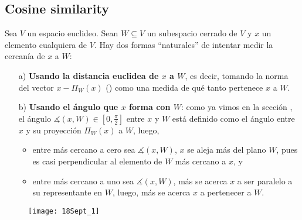 \QEDB
\vspace{0.2cm}





\subsection{Cosine similarity}
\label{cosine similarity}

Sea $V$ un espacio euclideo. 
Sean $W \subseteq V$ un subespacio cerrado de $V$ y 
$x$ un elemento cualquiera de $V$. Hay dos formas ``naturales''
de intentar medir la cercanía de $x$ a $W$:
\begin{itemize}
\item[a)] \textbf{Usando la distancia euclidea
de $x$ a $W$}, es decir, tomando la norma del vector
$x - \Pi_{W}(x)$ () como una medida
de qué tanto pertenece $x$ a $W$.
\item[b)] \textbf{Usando el ángulo que $x$ forma con $W$}: como ya
vimos en la sección , el ángulo 
$\measuredangle (x, W) \in [0, \frac{\pi}{2}]$
entre $x$ y $W$
está definido como el ángulo entre $x$ y su proyección
$\Pi_{W}(x)$ a $W$, luego, 
	\begin{itemize}
		\item entre más cercano a cero sea $\measuredangle (x, W)$,
		$x$ se aleja más del plano $W$, pues es casi perpendicular 
		al elemento de $W$ más cercano a $x$, y
		
		\item entre más cercano a uno sea $\measuredangle (x, W)$,
		más se acerca $x$ a ser paralelo a su representante en $W$,
		luego, más se acerca $x$ a pertenecer a $W$.
	\end{itemize}
\end{itemize}

\begin{figure}[H]
	\centering
	\texttt{[image:  18Sept\_1]} 
\end{figure}	

